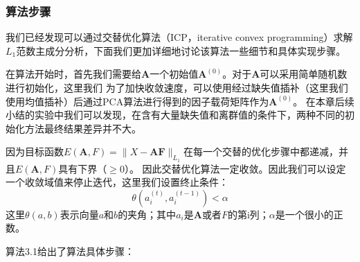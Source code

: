 \subsubsection{算法步骤}
我们已经发现可以通过交替优化算法（ICP，iterative convex programming）求解$L_1$范数主成分分析，下面我们更加详细地讨论该算法一些细节和具体实现步骤。

在算法开始时，首先我们需要给$\bm{A}$一个初始值$\bm{A}^{(0)}$。对于$\bm{A}$可以采用简单随机数进行初始化，这里我们
为了加快收敛速度，可以使用经过缺失值插补（这里我们使用均值插补）后通过PCA算法进行得到的因子载荷矩阵作为$\bm{A}^{(0)}$。
在本章后续小结的实验中我们可以发现，在含有大量缺失值和离群值的条件下，两种不同的初始化方法最终结果差异并不大。

因为目标函数$E(\bm{A}, F) = \|X - \bm{A}\bm{F}\|_{L_1}$在每一个交替的优化步骤中都递减，并且$E(\bm{A},F)$具有下界（$\geq 0$）。
因此交替优化算法一定收敛。因此我们可以设定一个收敛域值来停止迭代，这里我们设置终止条件：
    $$ \theta(a_i^{(t)}, a_i^{(t-1)}) <  \alpha $$
这里$\theta(a, b)$表示向量$a$和$b$的夹角；其中$a_i$是$\bm{A}$或者$F$的第i列；$\alpha$是一个很小的正数。

算法3.1给出了算法具体步骤：

